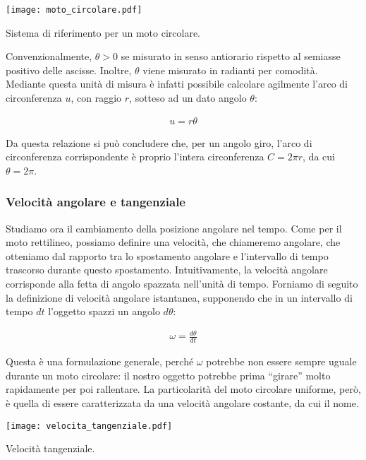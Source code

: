 \begin{marginfigure}
    \centering
    \texttt{[image: moto\_circolare.pdf]}
    \caption{Sistema di riferimento per un moto circolare.}
    \label{circref}
\end{marginfigure}

Convenzionalmente, $\theta > 0$ se misurato in senso antiorario
rispetto al semiasse positivo delle ascisse. Inoltre, $\theta$
viene misurato in radianti per comodità. Mediante questa unità di
misura è infatti possibile calcolare agilmente l'arco di circonferenza
$u$, con raggio $r$, sotteso ad un dato angolo $\theta$:

\begin{align}
    u = r\theta
\end{align}

\noindent Da questa relazione si può concludere che, per un angolo
giro, l'arco di circonferenza corrispondente è proprio l'intera
circonferenza $C = 2\pi r$, da cui $\theta = 2\pi$.

\subsubsection*{Velocità angolare e tangenziale}
Studiamo ora il cambiamento della posizione angolare nel tempo. Come
per il moto rettilineo, possiamo definire una velocità, che chiameremo
angolare, che otteniamo dal rapporto tra lo spostamento angolare e
l'intervallo di tempo trascorso durante questo spostamento. Intuitivamente,
la velocità angolare corrisponde alla fetta di angolo spazzata nell'unità
di tempo. Forniamo di seguito la definizione di velocità angolare istantanea,
supponendo che in un intervallo di tempo $dt$ l'oggetto spazzi un angolo
$d\theta$:

\begin{align}
    \omega = \frac{d\theta}{dt}
\end{align}

\noindent Questa è una formulazione generale, perché $\omega$ potrebbe
non essere sempre uguale durante un moto circolare: il nostro oggetto
potrebbe prima ``girare'' molto rapidamente per poi rallentare. La
particolarità del moto circolare uniforme, però, è quella di essere
caratterizzata da una velocità angolare costante, da cui il nome.

\begin{marginfigure}
    \centering
    \texttt{[image: velocita\_tangenziale.pdf]}
    \caption{Velocità tangenziale.}
    \label{circspeed}
\end{marginfigure}

